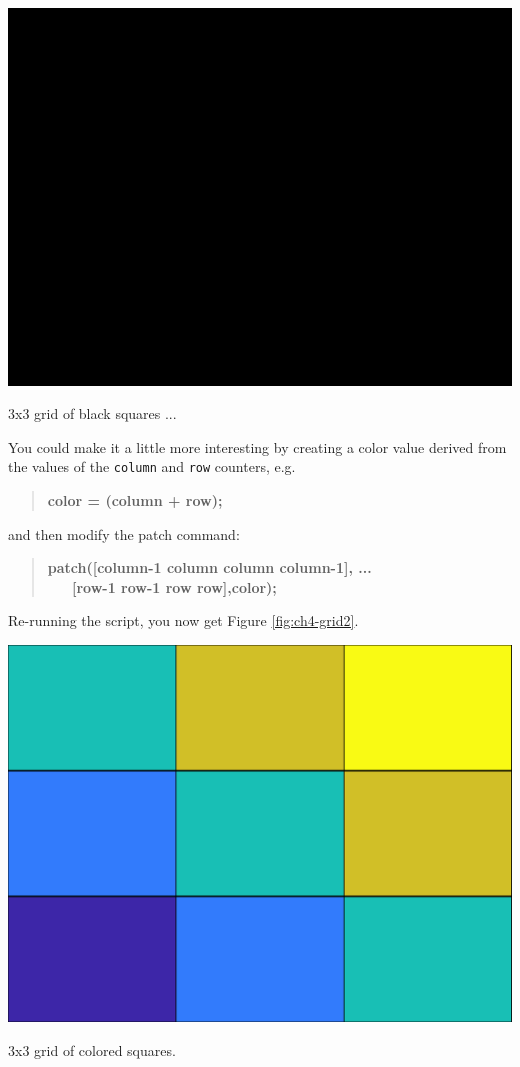 \documentclass{tufte-book} %
\newenvironment{docspecbold}{\begin{quotation}\ttfamily\bfseries\parskip0pt\parindent0pt\ignorespaces}{\end{quotation}}
\begin{document}
\begin{marginfigure}[-4.0in]
\includegraphics[width=\linewidth]{ch4-grid1.eps}
\caption{3x3 grid of black squares ...}
\label{fig:ch4-grid1}
\end{marginfigure}

You could make it a little more interesting by creating a color value derived from the values of the \texttt{column} and \texttt{row} counters, e.g.
\begin{docspecbold}
color = (column + row);
\end{docspecbold}
and then modify the patch command:
\begin{docspecbold}
patch([column-1 column column column-1], ...\\
\ \ \ [row-1 row-1 row row],color);
\end{docspecbold}

Re-running the script, you now get Figure \ref{fig:ch4-grid2}.

\begin{marginfigure}[-3.5in]
\includegraphics[width=\linewidth]{ch4-grid2.eps}
\caption{3x3 grid of colored squares.}
\label{fig:ch4-grid2}
\end{marginfigure}
\end{document}
